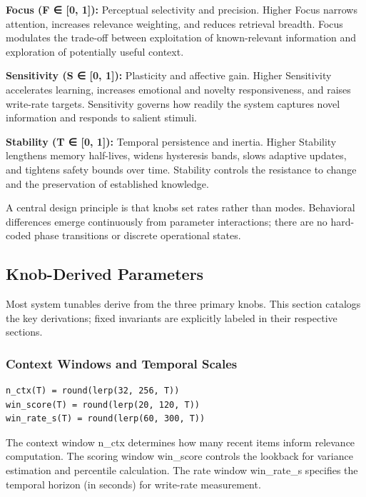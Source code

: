 \documentclass[
  letterpaper,
  DIV=11,
  numbers=noendperiod]{scrartcl}
\begin{document}
\textbf{Focus (F ∈ {[}0, 1{]}):} Perceptual selectivity and precision.
Higher Focus narrows attention, increases relevance weighting, and
reduces retrieval breadth. Focus modulates the trade-off between
exploitation of known-relevant information and exploration of
potentially useful context.

\textbf{Sensitivity (S ∈ {[}0, 1{]}):} Plasticity and affective gain.
Higher Sensitivity accelerates learning, increases emotional and novelty
responsiveness, and raises write-rate targets. Sensitivity governs how
readily the system captures novel information and responds to salient
stimuli.

\textbf{Stability (T ∈ {[}0, 1{]}):} Temporal persistence and inertia.
Higher Stability lengthens memory half-lives, widens hysteresis bands,
slows adaptive updates, and tightens safety bounds over time. Stability
controls the resistance to change and the preservation of established
knowledge.

A central design principle is that knobs set rates rather than modes.
Behavioral differences emerge continuously from parameter interactions;
there are no hard-coded phase transitions or discrete operational
states.

\subsection{Knob-Derived Parameters}\label{knob-derived-parameters}

Most system tunables derive from the three primary knobs. This section
catalogs the key derivations; fixed invariants are explicitly labeled in
their respective sections.

\subsubsection{Context Windows and Temporal
Scales}\label{context-windows-and-temporal-scales}

\begin{verbatim}
n_ctx(T) = round(lerp(32, 256, T))
win_score(T) = round(lerp(20, 120, T))
win_rate_s(T) = round(lerp(60, 300, T))
\end{verbatim}

The context window n\_ctx determines how many recent items inform
relevance computation. The scoring window win\_score controls the
lookback for variance estimation and percentile calculation. The rate
window win\_rate\_s specifies the temporal horizon (in seconds) for
write-rate measurement.
\end{document}
